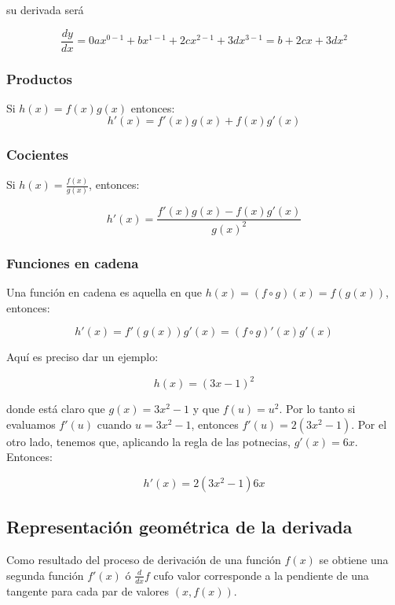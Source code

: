 \documentclass[
]{book}
\begin{document}
su derivada será

\[ \frac{dy}{dx} = 0ax^{0-1} + bx^{1-1} + 2cx^{2-1} + 3dx^{3-1}= b + 2cx + 3dx^2\]

\hypertarget{productos}{%
\subsubsection{Productos}\label{productos}}

Si \(h(x) = f(x)g(x)\) entonces:
\[h'(x) = f'(x)g(x) + f(x)g'(x)\]

\hypertarget{cocientes}{%
\subsubsection{Cocientes}\label{cocientes}}

Si \(h(x) = \frac{f(x)}{g(x)}\), entonces:

\[h'(x) = \frac{f'(x)g(x) - f(x)g'(x)}{g(x)^2}\]

\hypertarget{funciones-en-cadena}{%
\subsubsection{Funciones en cadena}\label{funciones-en-cadena}}

Una función en cadena es aquella en que \(h(x) = (f \circ g)(x) = f(g(x))\), entonces:

\[h'(x) = f'(g(x))g'(x) = (f \circ g)'(x) g'(x)\]

Aquí es preciso dar un ejemplo:

\[h(x) = (3x-1)^2\]

donde está claro que \(g(x) = 3x^2-1\) y que \(f(u) = u^2\). Por lo tanto si evaluamos \(f'(u)\) cuando \(u = 3x^2-1\), entonces \(f'(u) = 2(3x^2-1)\). Por el otro lado, tenemos que, aplicando la regla de las potnecias, \(g'(x) = 6x\). Entonces:

\[h'(x) = 2(3x^2-1)6x\]

\hypertarget{representaciuxf3n-geomuxe9trica-de-la-derivada}{%
\subsection{Representación geométrica de la derivada}\label{representaciuxf3n-geomuxe9trica-de-la-derivada}}

Como resultado del proceso de derivación de una función \(f(x)\) se obtiene una segunda función \(f'(x)\) ó \(\frac{d}{dx}f\) cufo valor corresponde a la pendiente de una tangente para cada par de valores \((x, f(x))\).
\end{document}
